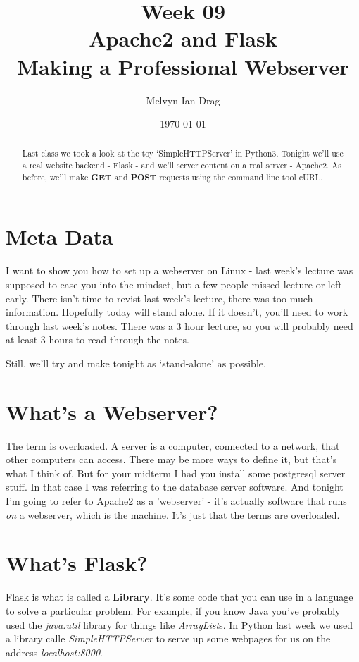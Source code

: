 \documentclass[10pt]{article}
\title{\textbf{Week 09} \\
\LARGE Apache2 and Flask \\
\Large Making a Professional Webserver}
\author{
	Melvyn Ian Drag
}
\date{\today}
\begin{document}
\maketitle

\begin{abstract}
Last class we took a look at the toy `SimpleHTTPServer' in Python3. Tonight we'll use a real website backend - Flask - and we'll server content on a real server - Apache2. As before, we'll make \textbf{GET} and \textbf{POST} requests using the command line tool cURL.
\end{abstract}

\section{Meta Data}
I want to show you how to set up a webserver on Linux - last week's lecture was supposed to ease you into the mindset, but a few people missed lecture or left early. There isn't time to revist last week's lecture, there was too much information. Hopefully today will stand alone. If it doesn't, you'll need to work through last week's notes. There was a 3 hour lecture, so you will probably need at least 3 hours to read through the notes.

Still, we'll try and make tonight as `stand-alone' as possible.

\section{What's a Webserver?}
The term is overloaded. A server is a computer, connected to a network, that other computers can access. There may be more ways to define it, but that's what I think of. But for your midterm I had you install some postgresql server stuff. In that case I was referring to the database server software. And tonight I'm going to refer to Apache2 as a 'webserver' - it's actually software that runs \textit{on} a webserver, which is the machine. It's just that the terms are overloaded.

\section{What's Flask?}
Flask is what is called a \textbf{Library}. It's some code that you can use in a language to solve a particular problem. For example, if you know Java you've probably used the \textit{java.util} library for things like \textit{ArrayList}s. In Python last week we used a library calle \textit{SimpleHTTPServer} to serve up some webpages for us on the address \textit{localhost:8000}.
\end{document}
